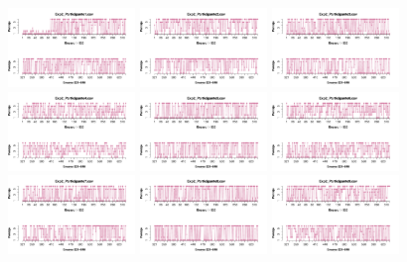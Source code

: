 \documentclass[a4paper ]{article}
\begin{document}
\begin{figure}[th]
\centering
\includegraphics[width=0.3\textwidth]{Figures/Rating_Exp2_P1} \includegraphics[width=0.3\textwidth]{Figures/Rating_Exp2_P2} \includegraphics[width=0.3\textwidth]{Figures/Rating_Exp2_P3}
\includegraphics[width=0.3\textwidth]{Figures/Rating_Exp2_P4} \includegraphics[width=0.3\textwidth]{Figures/Rating_Exp2_P5} \includegraphics[width=0.3\textwidth]{Figures/Rating_Exp2_P6}
\includegraphics[width=0.3\textwidth]{Figures/Rating_Exp2_P7} \includegraphics[width=0.3\textwidth]{Figures/Rating_Exp2_P8} \includegraphics[width=0.3\textwidth]{Figures/Rating_Exp2_P9}

\end{figure}
\end{document}
